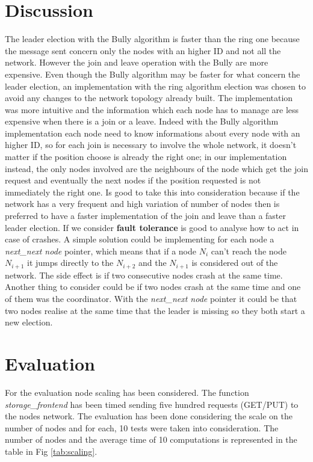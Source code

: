\documentclass[11pt,conference]{IEEEtran}
\begin{document}
\section{Discussion}
The leader election with the Bully algorithm is faster than the ring one because the message sent concern only the nodes with an higher ID and not all the network. However the join and leave operation with the Bully are more expensive.
Even though the Bully algorithm may be faster for what concern the leader election, an implementation with the ring algorithm election was chosen to avoid any changes to the network topology already built. The implementation was more intuitive and the information which each node has to manage are less expensive when there is a join or a leave. Indeed with the Bully algorithm implementation each node need to know informations about every node with an higher ID, so for each join is necessary to involve the whole network, it doesn't matter if the position choose is already the right one; in our implementation instead, the only nodes involved are the neighbours of the node which get the join request and eventually the next nodes if the position requested is not immediately the right one. Is good to take this into consideration because if the network has a very frequent and high variation of number of nodes then is preferred to have a faster implementation of the join and leave than a faster leader election.
\newline
If we consider \textbf{fault tolerance} is good to analyse how to act in case of crashes. A simple solution could be implementing for each node a \textit{next\_next node} pointer, which means that if a node $N_i$ can't reach the node $N_{i+1}$ it jumps directly to the $N_{i+2}$ and the $N_{i+1}$ is considered out of the network. The side effect is if two consecutive nodes crash at the same time. Another thing to consider could be if two nodes crash at the same time and one of them was the coordinator. With the \textit{next\_next node} pointer it could be that two nodes realise at the same time that the leader is missing so they both start a new election.


\section{Evaluation}

For the evaluation node scaling has been considered. The function \textit{storage\_frontend} has been timed sending five hundred requests (GET/PUT) to the nodes network. The evaluation has been done considering the scale on the number of nodes and for each, 10 tests were taken into consideration.
\newline
The number of nodes and the average time of 10 computations is represented in the table in Fig \ref{tab:scaling}.
\end{document}
